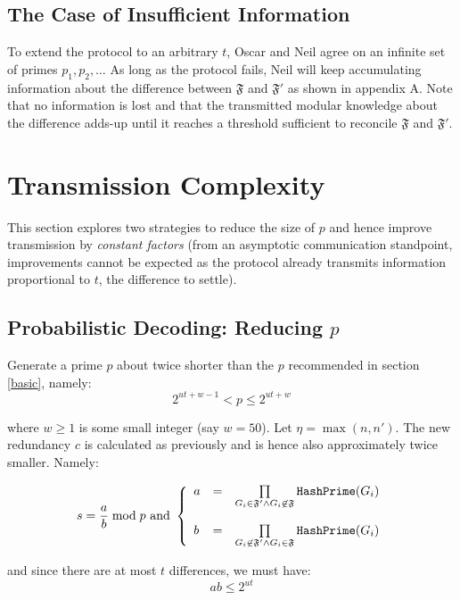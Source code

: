\documentclass[11pt]{llncs}
\begin{document}
\subsection{The Case of Insufficient Information}
\label{insuf}
To extend the protocol to an arbitrary $t$, Oscar and Neil agree on an infinite set of primes $p_1,p_2,\ldots$ As long as the protocol fails, Neil will keep accumulating information about the difference between $\mathfrak{F}$ and $\mathfrak{F}'$ as shown in appendix A. Note that no information is lost and that the transmitted modular knowledge about the difference adds-up until it reaches a threshold sufficient to reconcile $\mathfrak{F}$ and $\mathfrak{F}'$.\smallskip

\section{Transmission Complexity}

This section explores two strategies to reduce the size of $p$ and hence improve transmission by {\sl constant factors} (from an asymptotic communication standpoint, improvements cannot be expected as the protocol already transmits information proportional to $t$, the difference to settle).

\subsection{Probabilistic Decoding: Reducing $p$}

Generate a prime $p$ about twice shorter than the $p$ recommended in section \ref{basic}, namely:
\begin{equation}
\label{eqnewp}
2^{ut+w-1}<p \leq 2^{ut+w}
\end{equation}

where $w \geq 1$ is some small integer (say $w=50$). Let $\eta=\max(n,n')$. The new redundancy $c$ is calculated as previously and is hence also approximately twice smaller. Namely:

$$s=\frac{a}{b} \bmod p \mbox{~and~}
\left\{
\begin{array}{lcr}
a & =&  \prod\limits_{G_i \in \mathfrak{F}'\wedge G_i \not\in\mathfrak{F}} \mbox{{\tt HashPrime}}(G_i) \\
\\
b & = & \prod\limits_{G_i \not\in\mathfrak{F}' \wedge G_i \in\mathfrak{F}} \mbox{{\tt HashPrime}}(G_i)
\end{array}
\right.
$$

and since there are at most $t$ differences, we must have:
\begin{equation}
\label{eqab}
a b \leq 2^{ut}
\end{equation}
\end{document}
